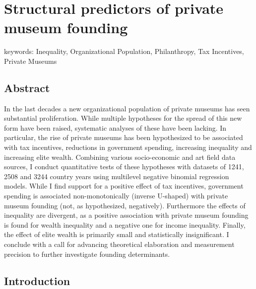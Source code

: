 \documentclass[11pt]{article}
\author{Johannes }
\date{\today}
\title{}
\begin{document}
\section*{Structural predictors of private museum founding}

\noindent
keywords: Inequality, Organizational Population, Philanthropy, Tax Incentives, Private Museums  

\subsection*{Abstract}

In the last decades a new organizational population of private museums has seen substantial proliferation.
While multiple hypotheses for the spread of this new form have been raised, systematic analyses of these have been lacking.
In particular, the rise of private museums has been hypothesized to be associated with tax incentives, reductions in government spending, increasing inequality and increasing elite wealth. 
Combining various socio-economic and art field data sources, I conduct quantitative tests of these hypotheses with datasets of 1241, 2508 and 3244 country years using multilevel negative binomial regression models.
While I find support for a positive effect of tax incentives, government spending is associated non-monotonically (inverse U-shaped) with private museum founding (not, as hypothesized, negatively). 
Furthermore the effects of inequality are divergent, as a positive association with private museum founding is found for wealth inequality and a negative one for income inequality.
Finally, the effect of elite wealth is primarily small and statistically insignificant. 
I conclude with a call for advancing theoretical elaboration and measurement precision to further investigate founding determinants. 





\subsection*{Introduction}
\end{document}
